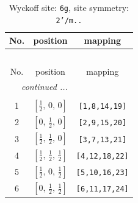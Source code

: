 \documentclass[fleqn,8pt]{jsarticle}
\begin{document}
\renewcommand{\arraystretch}{1.2}
\begin{longtable}{ccc}
\caption{Wyckoff site: {\tt 6g}, site symmetry: {\tt 2'/m..}}
 \\
 \hline \hline
No. & position & mapping \\ \hline \endfirsthead

\multicolumn{2}{l}{\tablename\ \thetable{}} \\
 \hline \hline
No. & position & mapping \\ \hline \endhead

 \hline \hline
\multicolumn{2}{r}{\footnotesize\it continued ...} \\ \endfoot

 \hline \hline
\multicolumn{2}{r}{} \\ \endlastfoot

1 & $\left[ \frac{1}{2},\, 0,\, 0 \right]$ & {\tt [1,8,14,19]} \\ \hline
2 & $\left[ 0,\, \frac{1}{2},\, 0 \right]$ & {\tt [2,9,15,20]} \\ \hline
3 & $\left[ \frac{1}{2},\, \frac{1}{2},\, 0 \right]$ & {\tt [3,7,13,21]} \\ \hline
4 & $\left[ \frac{1}{2},\, \frac{1}{2},\, \frac{1}{2} \right]$ & {\tt [4,12,18,22]} \\ \hline
5 & $\left[ \frac{1}{2},\, 0,\, \frac{1}{2} \right]$ & {\tt [5,10,16,23]} \\ \hline
6 & $\left[ 0,\, \frac{1}{2},\, \frac{1}{2} \right]$ & {\tt [6,11,17,24]} \\
\end{longtable}
\renewcommand{\arraystretch}{1.2}
\end{document}
